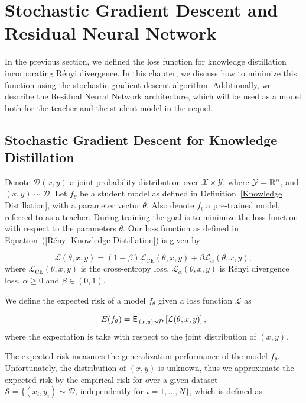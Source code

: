 \chapter{Stochastic Gradient Descent and Residual Neural Network}

In the previous section, we defined the loss function for knowledge distillation incorporating Rényi divergence. In this chapter, we discuss how to minimize this function using the stochastic gradient descent algorithm. Additionally, we describe the Residual Neural Network architecture, which will be used as a model both for the teacher and the student model in the sequel.

\section{Stochastic Gradient Descent for Knowledge Distillation}

Denote $\mathcal{D}(x,y)$ a joint probability distribution over $\mathcal{X} \times \mathcal{Y}$, where $\mathcal{Y} = \mathbb{R}^n$, and $(x,y) \sim \mathcal{D}$. Let $f_\theta$ be a student model as defined in Definition~\ref{Knowledge Distillation}, with a parameter vector $\theta$. Also denote $f_t$ a pre-trained model, referred to as a teacher. During training the goal is to minimize the loss function with respect to the parameters $\theta$. Our loss function as defined in Equation~(\ref{Rényi Knowledge Distillation}) is given by

\begin{equation}
	\mathcal{L}(\theta,x,y) = (1-\beta) \mathcal{L}_{\text{CE}}(\theta,x,y) + \beta \mathcal{L}_{\alpha}(\theta,x,y),
	\label{Loss function}
\end{equation}
where $\mathcal{L}_{\text{CE}}(\theta,x,y)$ is the cross-entropy loss, $\mathcal{L}_{\alpha}(\theta,x,y)$ is Rényi divergence loss, $\alpha \geq 0$ and $\beta \in (0,1)$.

We define the expected risk of a model $f_\theta$ given a loss function $\mathcal{L}$ as

\begin{equation}
	E(f_\theta) = \operatorname{\textsf{E}\,}_{(x,y) \sim \mathcal{D}} \left[\mathcal{L}(\theta,x,y)\right],
	\label{Expected risk}
\end{equation}
where the expectation is take with respect to the joint distribution of $(x,y)$.

The expected risk measures the generalization performance of the model $f_\theta$. Unfortunately, the distribution of $(x,y)$ is unknown, thus we approximate the expected risk by the empirical risk for over a given dataset $\mathcal{S} = \{ (x_i, y_i) \sim \mathcal{D}, \, \text{independently for } i = 1, \dots, N\}$, which is defined as

